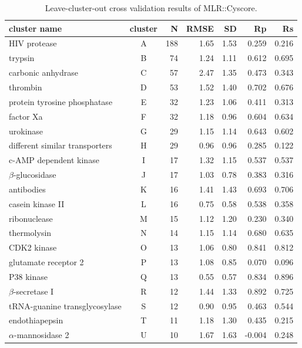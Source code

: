 \begin{table}
\caption{Leave-cluster-out cross validation results of MLR::Cyscore.}
\label{rfcyscore:lcocv1}
\begin{tabular}{lcrrrrr}
\hline
cluster name & cluster & N & RMSE & SD & Rp & Rs\\
\hline
HIV protease                   & A & 188 & 1.65 & 1.53 & 0.259 & 0.216\\
trypsin                        & B &  74 & 1.24 & 1.11 & 0.612 & 0.695\\
carbonic anhydrase             & C &  57 & 2.47 & 1.35 & 0.473 & 0.343\\
thrombin                       & D &  53 & 1.52 & 1.40 & 0.702 & 0.676\\
protein tyrosine phosphatase   & E &  32 & 1.23 & 1.06 & 0.411 & 0.313\\
factor Xa                      & F &  32 & 1.18 & 0.96 & 0.604 & 0.634\\
urokinase                      & G &  29 & 1.15 & 1.14 & 0.643 & 0.602\\
different similar transporters & H &  29 & 0.96 & 0.96 & 0.285 & 0.122\\
c-AMP dependent kinase         & I &  17 & 1.32 & 1.15 & 0.537 & 0.537\\
$\beta$-glucosidase            & J &  17 & 1.03 & 0.78 & 0.383 & 0.316\\
antibodies                     & K &  16 & 1.41 & 1.43 & 0.693 & 0.706\\
casein kinase II               & L &  16 & 0.75 & 0.58 & 0.538 & 0.358\\
ribonuclease                   & M &  15 & 1.12 & 1.20 & 0.230 & 0.340\\
thermolysin                    & N &  14 & 1.15 & 1.14 & 0.680 & 0.635\\
CDK2 kinase                    & O &  13 & 1.06 & 0.80 & 0.841 & 0.812\\
glutamate receptor 2           & P &  13 & 1.08 & 0.85 & 0.070 & 0.096\\
P38 kinase                     & Q &  13 & 0.55 & 0.57 & 0.834 & 0.896\\
$\beta$-secretase I            & R &  12 & 1.44 & 1.33 & 0.892 & 0.725\\
tRNA-guanine transglycosylase  & S &  12 & 0.90 & 0.95 & 0.463 & 0.544\\
endothiapepsin                 & T &  11 & 1.18 & 1.30 & 0.435 & 0.215\\
$\alpha$-mannosidase 2         & U &  10 & 1.67 & 1.63 &-0.004 & 0.248\\

\end{tabular}
\end{table}
